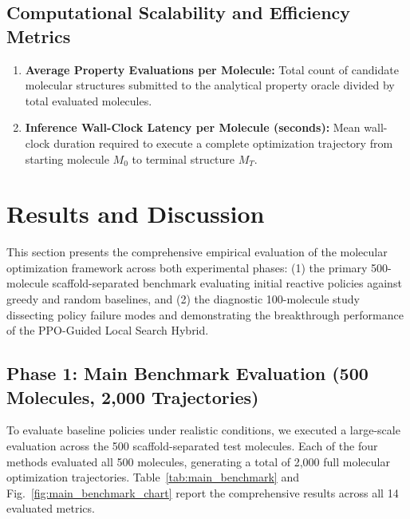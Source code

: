 \documentclass{ieeeaccess}
\begin{document}
\subsection{Computational Scalability and Efficiency Metrics}
\begin{enumerate}
    \item \textbf{Average Property Evaluations per Molecule:} Total count of candidate molecular structures submitted to the analytical property oracle divided by total evaluated molecules.
    \item \textbf{Inference Wall-Clock Latency per Molecule (seconds):} Mean wall-clock duration required to execute a complete optimization trajectory from starting molecule $M_0$ to terminal structure $M_T$.
\end{enumerate}


\section{Results and Discussion}
\label{sec:results}
This section presents the comprehensive empirical evaluation of the molecular optimization framework across both experimental phases: (1) the primary 500-molecule scaffold-separated benchmark evaluating initial reactive policies against greedy and random baselines, and (2) the diagnostic 100-molecule study dissecting policy failure modes and demonstrating the breakthrough performance of the PPO-Guided Local Search Hybrid.

\subsection{Phase 1: Main Benchmark Evaluation (500 Molecules, 2,000 Trajectories)}
To evaluate baseline policies under realistic conditions, we executed a large-scale evaluation across the 500 scaffold-separated test molecules. Each of the four methods evaluated all 500 molecules, generating a total of 2,000 full molecular optimization trajectories. Table~\ref{tab:main_benchmark} and Fig.~\ref{fig:main_benchmark_chart} report the comprehensive results across all 14 evaluated metrics.
\end{document}

